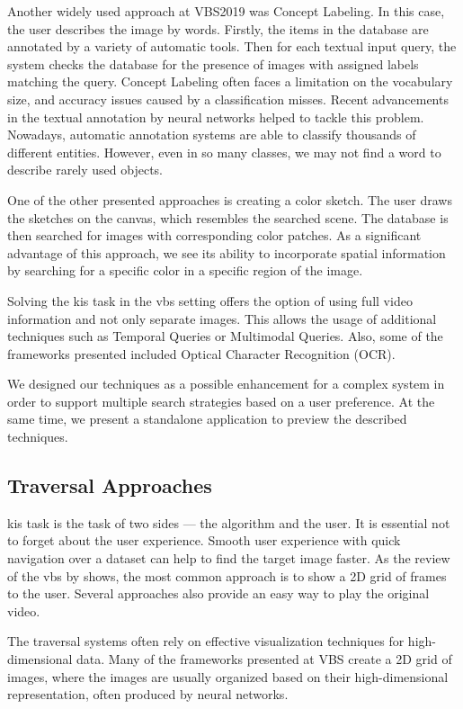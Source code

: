 Another widely used approach at VBS2019 was Concept Labeling. In this case, the user describes the image by words. Firstly, the items in the database are annotated by a variety of automatic tools. Then for each textual input query, the system checks the database for the presence of images with assigned labels matching the query. Concept Labeling often faces a limitation on the vocabulary size, and accuracy issues caused by a classification misses. Recent advancements in the textual annotation by neural networks helped to tackle this problem. Nowadays, automatic annotation systems are able to classify thousands of different entities. However, even in so many classes, we may not find a word to describe rarely used objects.

One of the other presented approaches is creating a color sketch. The user draws the sketches on the canvas, which resembles the searched scene. The database is then searched for images with corresponding color patches. As a significant advantage of this approach, we see its ability to incorporate spatial information by searching for a specific color in a specific region of the image.
 
Solving the \acrshort{kis} task in the \acrshort{vbs} setting offers the option of using full video information and not only separate images. This allows the usage of additional techniques such as Temporal Queries or Multimodal Queries. Also, some of the frameworks presented included Optical Character Recognition (OCR).

We designed our techniques as a possible enhancement for a complex system in order to support multiple search strategies based on a user preference. At the same time, we present a standalone application to preview the described techniques.

\subsection{Traversal Approaches}

\acrshort{kis} task is the task of two sides --- the algorithm and the user. It is essential not to forget about the user experience. Smooth user experience with quick navigation over a dataset can help to find the target image faster. As the review of the \acrshort{vbs} by \cite{rossetto2020interactive} shows, the most common approach is to show a 2D grid of frames to the user. Several approaches also provide an easy way to play the original video. 

The traversal systems often rely on effective visualization techniques for high-dimensional data. Many of the frameworks presented at VBS create a 2D grid of images, where the images are usually organized based on their high-dimensional representation, often produced by neural networks. 


